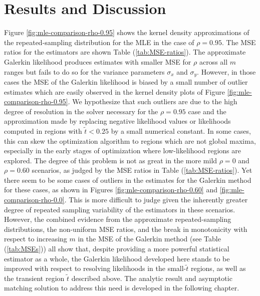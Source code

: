 \section{Results and Discussion}
Figure \ref{fig:mle-comparison-rho-0.95} shows the kernel density
approximations of the repeated-sampling distribution for the MLE in
the case of $\rho=0.95$. The MSE ratios for the estimators are shown
Table (\ref{tab:MSE-ratios}). The approximate Galerkin likelihood
produces estimates with smaller MSE for $\rho$ across all $m$ ranges
but fails to do so for the variance parameters $\sigma_x$ and
$\sigma_y$. However, in those cases the MSE of the Galerkin likelihood
is biased by a small number of outlier estimates which are easily
observed in the kernel density plots of Figure
\ref{fig:mle-comparison-rho-0.95}. We hypothesize that such outliers
are due to the high degree of resolution in the solver necessary for
the $\rho=0.95$ case and the approximation made by replacing negative
likelihood values or likelihoods computed in regions with
$\tilde{t} < 0.25$ by a small numerical constant. In some cases, this
can skew the optimization algorithm to regions which are not global
maxima, especially in the early stages of optimization where
low-likelihood regions are explored. The degree of this problem is not
as great in the more mild $\rho =0$ and $\rho = 0.60$ scenarios, as
judged by the MSE ratios in Table (\ref{tab:MSE-ratios}). Yet there
seem to be some cases of outliers in the estimates for the Galerkin
method for these cases, as shown in Figures
\ref{fig:mle-comparison-rho-0.60} and
\ref{fig:mle-comparison-rho-0.0}. This is more difficult to judge
given the inherently greater degree of repeated sampling variability
of the estimators in these scenarios. However, the combined evidence
from the approximate repeated-sampling distributions, the non-uniform
MSE ratios, and the break in monotonicity with respect to increasing
$m$ in the MSE of the Galerkin method (see Table (\ref{tab:MSEs})) all
show that, despite providing a more powerful statistical estimator as
a whole, the Galerkin likelihood developed here stands to be improved
with respect to resolving likelihoods in the small-$\tilde{t}$
regions, as well as the transient region $\tilde{t}$ described
above. The analytic result and asymptotic matching solution to address
this need is developed in the following chapter.

